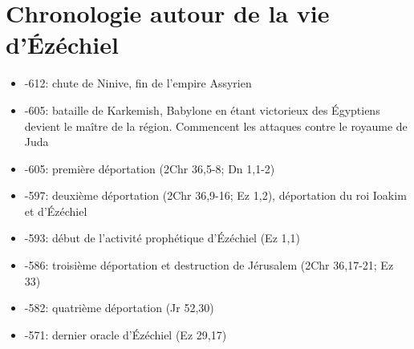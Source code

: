 \section*{Chronologie autour de la vie d'Ézéchiel}
\begin{itemize}[label=] 
\item -612: chute de Ninive, fin de l'empire Assyrien
\item -605: bataille de Karkemish, Babylone en étant victorieux des Égyptiens devient le maître de la région. Commencent les attaques contre le royaume de Juda
\item -605: première déportation (2Chr 36,5-8; Dn 1,1-2)
\item -597: deuxième déportation (2Chr 36,9-16; Ez 1,2), déportation du roi Ioakim et d'Ézéchiel
\item -593: début de l'activité prophétique d'Ézéchiel (Ez 1,1)
\item -586: troisième déportation et destruction de Jérusalem (2Chr 36,17-21; Ez 33)
\item -582: quatrième déportation (Jr 52,30)
\item -571: dernier oracle d'Ézéchiel (Ez 29,17)
\end{itemize}
